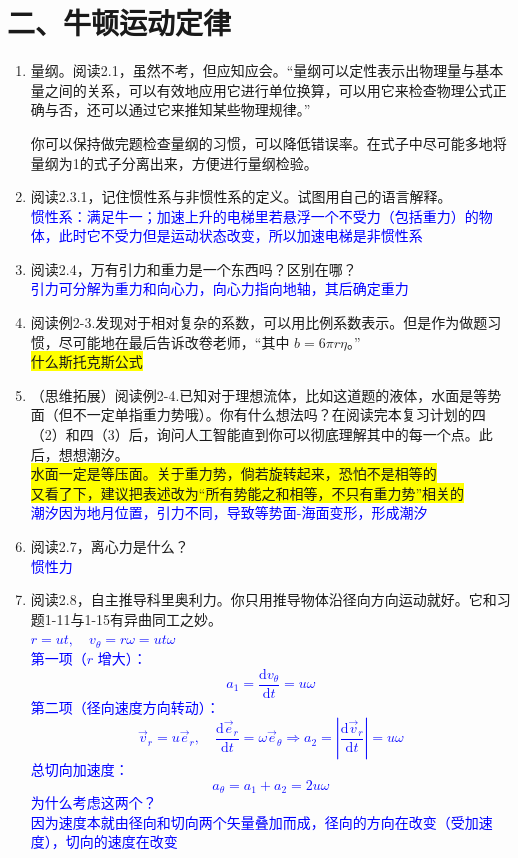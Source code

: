\documentclass[12pt,a4paper]{article}
\begin{document}
\section{二、牛顿运动定律}
\begin{enumerate}[label=\arabic*.,leftmargin=*]
    \item 量纲。阅读2.1，虽然不考，但应知应会。“量纲可以定性表示出物理量与基本量之间的关系，可以有效地应用它进行单位换算，可以用它来检查物理公式正确与否，还可以通过它来推知某些物理规律。”
    
    你可以保持做完题检查量纲的习惯，可以降低错误率。在式子中尽可能多地将量纲为1的式子分离出来，方便进行量纲检验。


    \item 阅读2.3.1，记住惯性系与非惯性系的定义。试图用自己的语言解释。\\
    \textcolor{blue}{惯性系：满足牛一；加速上升的电梯里若悬浮一个不受力（包括重力）的物体，此时它不受力但是运动状态改变，所以加速电梯是非惯性系}

    \item 阅读2.4，万有引力和重力是一个东西吗？区别在哪？\\
    \textcolor{blue}{引力可分解为重力和向心力，向心力指向地轴，其后确定重力}

    \item 阅读例2-3.发现对于相对复杂的系数，可以用比例系数表示。但是作为做题习惯，尽可能地在最后告诉改卷老师，“其中 $b=6\pi r\eta$。”\\
    \colorbox{yellow}{什么斯托克斯公式}


    \item （思维拓展）阅读例2-4.已知对于理想流体，比如这道题的液体，水面是等势面（但不一定单指重力势哦）。你有什么想法吗？在阅读完本复习计划的四（2）和四（3）后，询问人工智能直到你可以彻底理解其中的每一个点。此后，想想潮汐。\\
    \colorbox{yellow}{水面一定是等压面。关于重力势，倘若旋转起来，恐怕不是相等的}\\
    \colorbox{yellow}{又看了下，建议把表述改为“所有势能之和相等，不只有重力势”相关的}\\
    \textcolor{blue}{潮汐因为地月位置，引力不同，导致等势面-海面变形，形成潮汐}

    \item 阅读2.7，离心力是什么？\\
    \textcolor{blue}{惯性力}


    \item 阅读2.8，自主推导科里奥利力。你只用推导物体沿径向方向运动就好。它和习题1-11与1-15有异曲同工之妙。\\
    \textcolor{blue}{
$r=ut,\quad v_\theta=r\omega=ut\omega$\\
第一项（$r$ 增大）：
\[
a_1=\frac{\mathrm{d}v_\theta}{\mathrm{d}t}=u\omega
\]
第二项（径向速度方向转动）：
\[
\vec{v}_r=u\vec{e}_r,\quad
\frac{\mathrm{d}\vec{e}_r}{\mathrm{d}t}=\omega\vec{e}_\theta
\Rightarrow
a_2=\left|\frac{\mathrm{d}\vec{v}_r}{\mathrm{d}t}\right|=u\omega
\]
总切向加速度：
\[
a_\theta=a_1+a_2=2u\omega
\]
为什么考虑这两个？\\
因为速度本就由径向和切向两个矢量叠加而成，径向的方向在改变（受加速度），切向的速度在改变
}
    


\end{enumerate}
\end{document}
